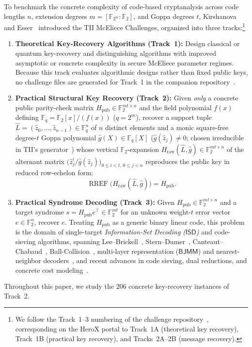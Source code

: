 \documentclass[11pt,a4paper]{article}
\theoremstyle{definition}
\theoremstyle{remark}
\newcommand{\F}{\mathbb{F}}
\newcommand{\RREF}{\operatorname{RREF}}
\newcommand{\ISD}{\mathsf{ISD}}
\newcommand{\BJMM}{\mathsf{BJMM}}
\begin{document}
To benchmark the concrete complexity of code-based cryptanalysis across code lengths $n$, extension degrees $m = [\F_{2^m} : \F_2]$, and Goppa degrees $t$, Kirshanova and Esser~\cite{KE23} introduced the TII McEliece Challenges, organized into three tracks:\footnote{We follow the Track~1--3 numbering of the challenge repository~\cite{KE23}, corresponding on the HeroX portal to Track~1A (theoretical key recovery), Track~1B (practical key recovery), and Tracks~2A--2B (message recovery).}
\begin{enumerate}[leftmargin=2em]
    \item \textbf{Theoretical Key-Recovery Algorithms (Track~1):}
    Design classical or quantum key-recovery and distinguishing algorithms with improved asymptotic or concrete complexity in secure McEliece parameter regimes. Because this track evaluates algorithmic designs rather than fixed public keys, no challenge files are generated for Track~1 in the companion repository~\cite{KE23}.
    \item \textbf{Practical Structural Key Recovery (Track~2):}
    Given \emph{only} a concrete public parity-check matrix $H_{\text{pub}} \in \F_2^{mt \times n}$ and the field polynomial $f(x)$ defining $\F_q = \F_2[x]/(f(x))$ ($q = 2^m$), recover a support tuple $\hat{L} = (\hat{z}_0, \dots, \hat{z}_{n-1}) \in \F_q^n$ of $n$ distinct elements and a monic square-free degree-$t$ Goppa polynomial $\hat{g}(X) \in \F_q[X]$ ($\hat{g}(\hat{z}_j) \neq 0$; chosen irreducible in TII's generator~\cite{KE23}) whose vertical $\F_2$-expansion $H_{\text{raw}}(\hat{L}, \hat{g}) \in \F_2^{mt \times n}$ of the alternant matrix $\big(\hat{z}_j^i / \hat{g}(\hat{z}_j)\big)_{0 \le i < t,\, 0 \le j < n}$ reproduces the public key in reduced row-echelon form:
    \begin{equation}
    \label{eq:intro-rref}
        \RREF\!\big(H_{\text{raw}}(\hat{L}, \hat{g})\big) = H_{\text{pub}}.
    \end{equation}
    \item \textbf{Practical Syndrome Decoding (Track~3):}
    Given $H_{\text{pub}} \in \F_2^{mt \times n}$ and a target syndrome $s = H_{\text{pub}} e^\top \in \F_2^{mt}$ for an unknown weight-$t$ error vector $e \in \F_2^n$, recover $e$. Treating $H_{\text{pub}}$ as a generic binary linear code, this problem is the domain of single-target \emph{Information-Set Decoding ($\ISD$)} and code-sieving algorithms, spanning Lee--Brickell~\cite{LB88}, Stern--Dumer~\cite{Ste88,Dum91}, Canteaut--Chabaud~\cite{CC98}, Ball-Collision~\cite{BLP11}, multi-layer representation ($\BJMM$) and nearest-neighbor decoders~\cite{MMT11,BJMM12,MO15}, and recent advances in code sieving, dual reductions, and concrete cost modeling~\cite{DEEK24,CDMT24,BC24}.
\end{enumerate}
Throughout this paper, we study the $206$ concrete key-recovery instances of Track~2.
\end{document}
